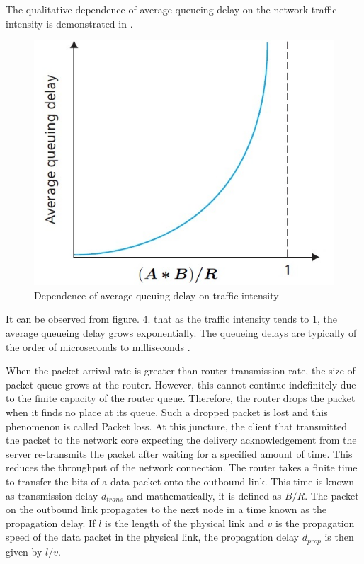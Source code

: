 \documentclass[10pt,conference,compsocconf]{IEEEtran}
\begin{document}
The qualitative dependence of average queueing delay on the network traffic intensity is demonstrated in . 
\begin{figure} [h]
\centering
\includegraphics [scale=0.3]{"Figures/TrafficIntensity"}
\caption{Dependence of average queuing delay on traffic intensity \protect\cite{Kurose_Ross:2013:Computer_Networking}}
\label{fig:TrafficIntensity}
\end{figure}
It can be observed from figure. 4. that as the traffic intensity tends to 1, the average queueing delay grows exponentially. The queueing delays are typically of the order of microseconds to milliseconds \cite{Kurose_Ross:2013:Computer_Networking}.

When the packet arrival rate is greater than router transmission rate, the size of packet queue grows at the router. However, this cannot continue indefinitely due to the finite capacity of the router queue. Therefore, the router drops the packet when it finds no place at its queue. Such a dropped packet is lost and this phenomenon is called Packet loss. At this juncture, the client that transmitted the packet to the network core expecting the delivery acknowledgement from the server re-transmits the packet after waiting for a specified amount of time. This reduces the throughput of the network connection. The router takes a finite time to transfer the bits of a data packet onto the outbound link. This time is known as transmission delay $d_{trans}$ and mathematically, it is defined as $B/R$. The packet on the outbound link propagates to the next node in a time known as the propagation delay. If $l$ is the length of the physical link and $v$ is the propagation speed of the data packet in the physical link, the propagation delay $d_{prop}$ is then given by $l/v$. 
\end{document}
